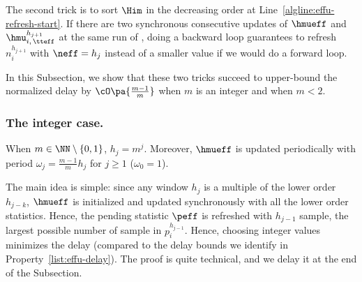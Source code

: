 The second trick is to sort $\Him$ in the decreasing order at Line~\ref{algline:effu-refresh-start}. If there are two synchronous consecutive updates of $\hmueff$ and $\hmu_{i,\, \tteff}^{h_{j+1}}$ at the same run of \EFF, doing a backward loop guarantees to refresh $n_i^{h_{j+1}}$ with $\neff = h_j$ instead of a smaller value if we would do a forward loop.

In this Subsection, we show that these two tricks succeed to upper-bound the normalized delay by $\cO\pa{\frac{m-1}{m}}$ when $m$ is an integer and when $m < 2$.


\subsubsection{The integer case.}
\begin{proposition}
\label{prop:effu-delay-int}
When $m \in \NN \setminus \left\{ 0, 1\right\}$,  $h_j = m^j$. Moreover, $\hmueff$ is updated periodically with period $\omega_j = \frac{m-1}{m} h_j$ for $j\geq1$ ($\omega_0 =1$).
\end{proposition}


The main idea is simple: since any window $h_j$ is a multiple of the lower order $h_{j-k}$, $\hmueff$ is initialized and updated synchronously with all the lower order statistics. Hence, the pending statistic $\peff$ is refreshed with $h_{j-1}$ sample, the largest possible number of sample in $p_i^{h_{j-1}}$. Hence, choosing integer values minimizes the delay (compared to the delay bounds we identify in Property~\ref{list:effu-delay}). The proof is quite technical, and we delay it at the end of the Subsection. 

